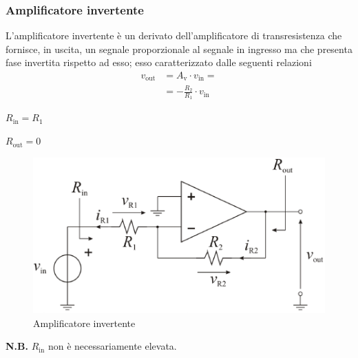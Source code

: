 \documentclass[a4paper]{article}
\begin{document}
				\subsubsection{Amplificatore invertente}
					L'amplificatore invertente è un derivato dell'amplificatore di transresistenza che fornisce, in uscita, un segnale proporzionale al segnale in ingresso ma che presenta fase invertita rispetto ad esso; esso caratterizzato dalle seguenti relazioni
					\begin{equation*}
						\begin{split}
							v_{\mathrm{out}} &= A_{\mathrm{v}} \cdot v_{\mathrm{in}} = \\
											 &= -\frac{R_{2}}{R_{1}} \cdot v_{\mathrm{in}}
						\end{split}
					\end{equation*}
					\begin{center}
						$ R_{\mathrm{in}} = R_{1} $
					\end{center}
					\newline
					\begin{center}
						$ R_{\mathrm{out}} = 0 $
					\end{center}
					\newline
					\begin{figure}[h!]
						\centering
						\includegraphics[scale=0.7]{amplificatoreInvertente}
						\caption{Amplificatore invertente}
						\label{fig:amplificatoreInvertente}
					\end{figure}
					\newline
					\begin{scriptsize}
						\textbf{N.B.} $ R_{\mathrm{in}} $ non è necessariamente elevata. 
					\end{scriptsize}
\end{document}
